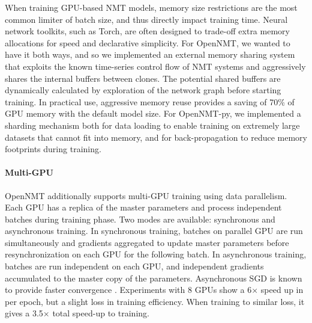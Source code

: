 \documentclass[]{article}
\begin{document}
When training GPU-based NMT models, memory size restrictions are the
most common limiter of batch size, and thus directly impact training
time. Neural network toolkits, such as Torch, are often designed to
trade-off extra memory allocations for speed and declarative
simplicity. For OpenNMT, we wanted to have it both ways, and so we
implemented an external memory sharing system that exploits the known
time-series control flow of NMT systems and aggressively shares the
internal buffers between clones. The potential shared buffers are
dynamically calculated by exploration of the network graph before
starting training. In practical use, aggressive memory reuse provides
a saving of 70\% of GPU memory with the default model size. For OpenNMT-py, we implemented a sharding mechanism both for data loading to enable training on extremely large datasets that cannot fit into memory, and for back-propagation to reduce memory footprints during training.

\paragraph{Multi-GPU} OpenNMT additionally supports multi-GPU training
using data parallelism. Each GPU has a replica of the master
parameters and process independent batches during training phase.  Two
modes are available: synchronous and asynchronous training.  In
synchronous training, batches on parallel GPU are run simultaneously
and gradients aggregated to update master parameters before
resynchronization on each GPU for the following batch.  In
asynchronous training, batches are run independent on each GPU, and
independent gradients accumulated to the master copy of the
parameters. Asynchronous SGD is known to provide faster convergence
\citep{dean2012large}. Experiments with 8 GPUs show a 6$\times$ speed up in 
per epoch, but a slight loss in training efficiency. When training to similar
loss, it gives a 3.5$\times$ total speed-up to training.
\end{document}
